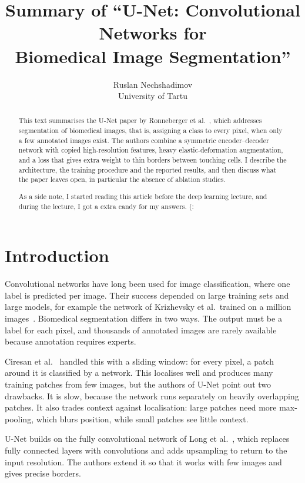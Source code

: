 \documentclass[10pt,twocolumn]{article}
\title{\vspace{-1.2em}\textbf{Summary of ``U-Net: Convolutional Networks for\\Biomedical Image Segmentation''}\vspace{-0.4em}}
\author{Ruslan Nechshadimov\\\small University of Tartu}
\date{}
\begin{document}
\maketitle
\vspace{-1.5em}
\begin{abstract}
\noindent\small
This text summarises the U-Net paper by Ronneberger et al.~\cite{unet}, which addresses segmentation of biomedical images, that is, assigning a class to every pixel, when only a few annotated images exist. The authors combine a symmetric encoder--decoder network with copied high-resolution features, heavy elastic-deformation augmentation, and a loss that gives extra weight to thin borders between touching cells. I describe the architecture, the training procedure and the reported results, and then discuss what the paper leaves open, in particular the absence of ablation studies.

As a side note, I started reading this article before the deep learning lecture, and during the lecture, I got a extra candy for my answers. (:

\end{abstract}

\section{Introduction}
Convolutional networks have long been used for image classification, where one label is predicted per image. Their success depended on large training sets and large models, for example the network of Krizhevsky et al.\ trained on a million images~\cite{alexnet}. Biomedical segmentation differs in two ways. The output must be a label for each pixel, and thousands of annotated images are rarely available because annotation requires experts.

Ciresan et al.~\cite{ciresan} handled this with a sliding window: for every pixel, a patch around it is classified by a network. This localises well and produces many training patches from few images, but the authors of U-Net point out two drawbacks. It is slow, because the network runs separately on heavily overlapping patches. It also trades context against localisation: large patches need more max-pooling, which blurs position, while small patches see little context.

U-Net builds on the fully convolutional network of Long et al.~\cite{fcn}, which replaces fully connected layers with convolutions and adds upsampling to return to the input resolution. The authors extend it so that it works with few images and gives precise borders.
\end{document}
